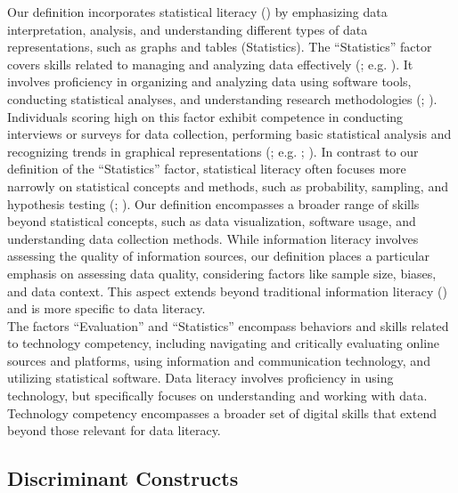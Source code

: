 \documentclass[
  12pt,
  a4paper,
  twoside]{article}
\begin{document}
Our definition incorporates statistical literacy () by emphasizing data interpretation, analysis, and understanding different types of data representations, such as graphs and tables (Statistics).
The ``Statistics'' factor covers skills related to managing and analyzing data effectively (; e.g. ). It involves proficiency in organizing and analyzing data using software tools, conducting statistical analyses, and understanding research methodologies (; ). Individuals scoring high on this factor exhibit competence in conducting interviews or surveys for data collection, performing basic statistical analysis and recognizing trends in graphical representations (; e.g. ; ). In contrast to our definition of the ``Statistics'' factor, statistical literacy often focuses more narrowly on statistical concepts and methods, such as probability, sampling, and hypothesis testing (; ). Our definition encompasses a broader range of skills beyond statistical concepts, such as data visualization, software usage, and understanding data collection methods. While information literacy involves assessing the quality of information sources, our definition places a particular emphasis on assessing data quality, considering factors like sample size, biases, and data context. This aspect extends beyond traditional information literacy () and is more specific to data literacy.\\
The factors ``Evaluation'' and ``Statistics'' encompass behaviors and skills related to technology competency, including navigating and critically evaluating online sources and platforms, using information and communication technology, and utilizing statistical software. Data literacy involves proficiency in using technology, but specifically focuses on understanding and working with data. Technology competency encompasses a broader set of digital skills that extend beyond those relevant for data literacy.

\subsection{Discriminant Constructs}\label{discriminant-constructs}
\end{document}
